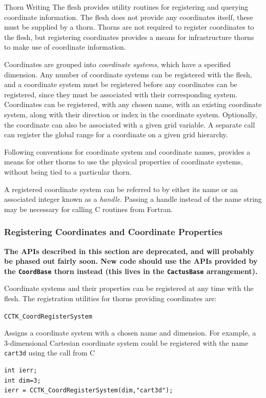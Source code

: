 \begin{cactuspart}{Thorn Writing}
The flesh provides utility routines for registering and querying
coordinate information. The flesh does not provide any coordinates
itself, these must be supplied by a thorn. Thorns are not required to
register coordinates to the flesh, but registering coordinates
provides a means for infrastructure thorns to make use of coordinate
information.

Coordinates are grouped into \textit{coordinate systems}, which have a
specified dimension. Any number of coordinate systems can be
registered with the flesh, and a coordinate system must be registered
before any coordinates can be registered, since they must be
associated with their corresponding system.  Coordinates can be
registered, with any chosen name, with an existing coordinate system,
along with their direction or index in the coordinate system.
Optionally, the coordinate can also be associated with a given grid
variable.  A separate call can register the global range for a
coordinate on a given grid hierarchy.

Following conventions for coordinate system and coordinate names,
provides a means for other thorns to use the physical properties of
coordinate systems, without being tied to a particular thorn.

A registered coordinate system can be referred to by either its name or
an associated integer known as a \textit{handle}. Passing a handle instead
of the name string may be necessary for calling C routines from Fortran.


\subsubsection{Registering Coordinates and Coordinate Properties}

\textbf{The APIs described in this section are deprecated, and will
probably be phased out fairly soon.
New code should use the APIs provided by the \texttt{CoordBase} thorn
instead (this lives in the \texttt{CactusBase} arrangement).}

Coordinate systems and their properties can be registered at any time with the flesh.
The registration utilities for thorns providing coordinates are:
\begin{Lentry}

\item[\texttt{CCTK\_CoordRegisterSystem}]

Assigns a coordinate system with a chosen name and dimension. For example,
a 3-dimensional Cartesian coordinate system could be registered with the
name \texttt{cart3d} using the call from C
%
\begin{verbatim}
int ierr;
int dim=3;
ierr = CCTK_CoordRegisterSystem(dim,"cart3d");
\end{verbatim}


\end{Lentry}
\end{cactuspart}
